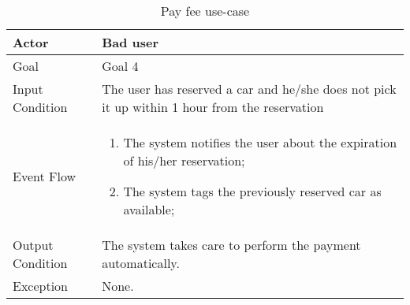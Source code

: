 \begin{table}[H]
\begin{center}
\begin{tabular}{p{} | p{}}
\hline
Actor & Bad user\\
\hline
Goal & Goal 4\\
\hline
Input Condition & The user has reserved a car and he/she does not pick it up within 1 hour from the reservation\\
\hline
Event Flow & 
\begin{enumerate}
\item The system notifies the user about the expiration of his/her reservation;
\item The system tags the previously reserved car as available;
\end{enumerate} \\
\hline
Output Condition & The system takes care to perform the payment automatically.\\
\hline
Exception & None.\\
\hline
\end{tabular}
\end{center}
\caption{Pay fee use-case}
\label{apply_fee_uc}
\end{table}